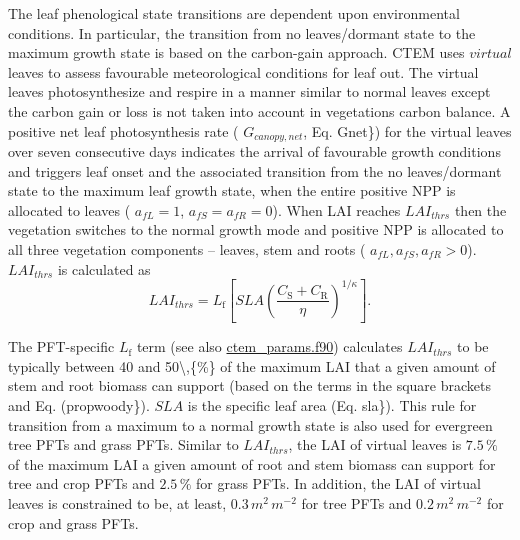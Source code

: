 The leaf phenological state transitions are dependent upon environmental conditions. In particular, the transition from no leaves/dormant state to the maximum growth state is based on the carbon-\/gain approach. C\+T\+E\+M uses $\textit{virtual}$ leaves to assess favourable meteorological conditions for leaf out. The virtual leaves photosynthesize and respire in a manner similar to normal leaves except the carbon gain or loss is not taken into account in vegetation\textquotesingle{}s carbon balance. A positive net leaf photosynthesis rate ( $G_{canopy,net}$, Eq. Gnet\}) for the virtual leaves over seven consecutive days indicates the arrival of favourable growth conditions and triggers leaf onset and the associated transition from the no leaves/dormant state to the maximum leaf growth state, when the entire positive N\+P\+P is allocated to leaves ( $a_{fL} = 1$, $a_{fS} = a_{fR} = 0$). When L\+A\+I reaches ${LAI}_{thrs}$ then the vegetation switches to the normal growth mode and positive N\+P\+P is allocated to all three vegetation components -- leaves, stem and roots ( $a_{fL}, a_{fS}, a_{fR} > 0$). ${LAI}_{thrs}$ is calculated as \[ \label{LAI_thrs} {LAI}_{thrs} = L_\mathrm{f} \left[ {SLA}\left(\frac{C_\mathrm{S} + C_\mathrm{R}}{\eta}\right)^{1/\kappa} \right].\]

The P\+F\+T-\/specific $L_\mathrm{f}$ term (see also \hyperlink{ctem__params_8f90}{ctem\+\_\+params.\+f90}) calculates ${LAI}_{thrs}$ to be typically between 40 and 50\textbackslash{},\{\%\} of the maximum L\+A\+I that a given amount of stem and root biomass can support (based on the terms in the square brackets and Eq. (propwoody\}). $SLA$ is the specific leaf area (Eq. sla\}). This rule for transition from a maximum to a normal growth state is also used for evergreen tree P\+F\+Ts and grass P\+F\+Ts. Similar to ${LAI}_{thrs}$, the L\+A\+I of virtual leaves is $7.5\,{\%}$ of the maximum L\+A\+I a given amount of root and stem biomass can support for tree and crop P\+F\+Ts and $2.5\,{\%}$ for grass P\+F\+Ts. In addition, the L\+A\+I of virtual leaves is constrained to be, at least, $0.3\,m^2\,m^{-2}$ for tree P\+F\+Ts and $0.2\,m^2\,m^{-2}$ for crop and grass P\+F\+Ts.

